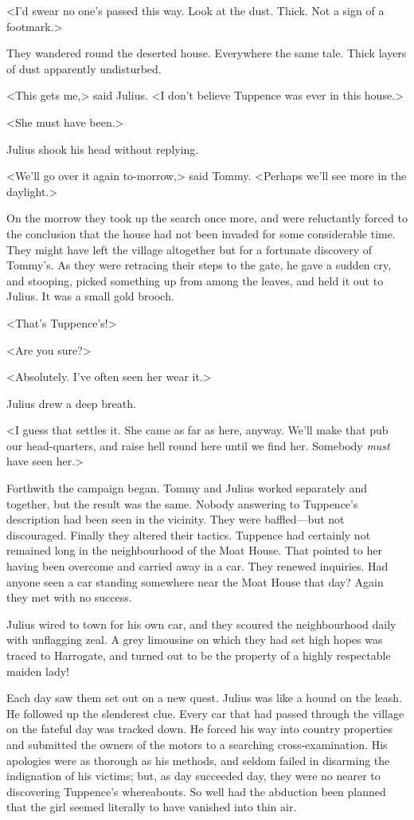 <I'd swear no one's passed this way. Look at the dust. Thick. Not a sign of a footmark.>

They wandered round the deserted house. Everywhere the same tale. Thick layers of dust apparently undisturbed.

<This gets me,> said Julius. <I don't believe Tuppence was ever in this house.>

<She must have been.>

Julius shook his head without replying.

<We'll go over it again to-morrow,> said Tommy. <Perhaps we'll see more in the daylight.>

On the morrow they took up the search once more, and were reluctantly forced to the conclusion that the house had not been invaded for some considerable time. They might have left the village altogether but for a fortunate discovery of Tommy's. As they were retracing their steps to the gate, he gave a sudden cry, and stooping, picked something up from among the leaves, and held it out to Julius. It was a small gold brooch.

<That's Tuppence's!>

<Are you sure?>

<Absolutely. I've often seen her wear it.>

Julius drew a deep breath.

<I guess that settles it. She came as far as here, anyway. We'll make that pub our head-quarters, and raise hell round here until we find her. Somebody \emph{must} have seen her.>

Forthwith the campaign began. Tommy and Julius worked separately and together, but the result was the same. Nobody answering to Tuppence's description had been seen in the vicinity. They were baffled—but not discouraged. Finally they altered their tactics. Tuppence had certainly not remained long in the neighbourhood of the Moat House. That pointed to her having been overcome and carried away in a car. They renewed inquiries. Had anyone seen a car standing somewhere near the Moat House that day? Again they met with no success.

Julius wired to town for his own car, and they scoured the neighbourhood daily with unflagging zeal. A grey limousine on which they had set high hopes was traced to Harrogate, and turned out to be the property of a highly respectable maiden lady!

Each day saw them set out on a new quest. Julius was like a hound on the leash. He followed up the slenderest clue. Every car that had passed through the village on the fateful day was tracked down. He forced his way into country properties and submitted the owners of the motors to a searching cross-examination. His apologies were as thorough as his methods, and seldom failed in disarming the indignation of his victims; but, as day succeeded day, they were no nearer to discovering Tuppence's whereabouts. So well had the abduction been planned that the girl seemed literally to have vanished into thin air.

